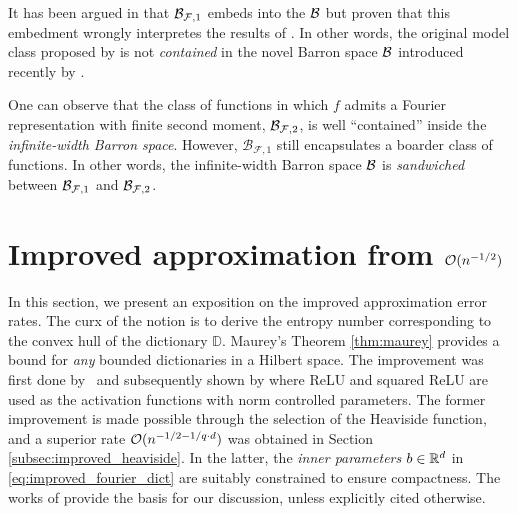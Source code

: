 \begin{remark}

    It has been argued in \cite{eRepresentationFormulasPointwise2020} that
    $\mathcal{B}_{\mathcal{F},1}$ embeds into the $\mathcal{B}$ but
    \cite{carageaNeuralNetworkApproximation2022} proven that this embedment
    wrongly interpretes the results of
    \cite{barronUniversalApproximationBounds1993,barronNeuralNetApproximation1992}.
    In other words, the original model class proposed by
    \cite{barronNeuralNetApproximation1992} is not \textit{contained} in the
    novel Barron space $\mathcal{B}$ introduced recently by
    \cite{eBarronSpaceFlowinduced2021}. 
    

    One can observe that the class of functions in which $f$ admits a Fourier
    representation with finite second moment, $\mathcal{B}_{\mathcal{F}, 2}$, is well
    ``contained'' inside the \textit{infinite-width Barron space}. However,
    $\mathcal{B}_{\mathcal{F}, 1}$ still encapsulates a boarder class of
    functions. In other words, the infinite-width Barron space $\mathcal{B}$ is
    \textit{sandwiched} between $\mathcal{B}_{\mathcal{F}, 1}$ and $\mathcal{B}_{\mathcal{F},
    2}$.
\end{remark}


\section{Improved approximation from $\mathcal{O}(n^{-1/2})$}
\label{sec:improvement}


In this section, we present an exposition on the improved approximation error
rates. The curx of the notion is to derive the entropy number corresponding to
the convex hull of the dictionary $\mathbb{D}$. Maurey's Theorem
\ref{thm:maurey} provides a bound for \textit{any} bounded dictionaries in a
Hilbert space. The improvement was first done
by~\cite{makovozRandomApproximantsNeural1996} and subsequently shown by
\cite{klusowskiApproximationCombinationsReLU2018} where ReLU and squared ReLU
are used as the activation functions with norm controlled parameters. The former
improvement is made possible through the selection of the Heaviside function,
and a superior rate $\mathcal{O}(n^{-1/2 - 1/q\cdot d})$ was obtained in Section
\ref{subsec:improved_heaviside}. In the latter, the \textit{inner parameters}
$b\in\mathbb{R}^d$ in \eqref{eq:improved_fourier_dict} are suitably constrained to
ensure compactness. The works of \cite{maUniformApproximationRates2022,
siegelSharpBoundsApproximation2022, klusowskiApproximationCombinationsReLU2018a}
provide the basis for our discussion, unless explicitly cited otherwise.

